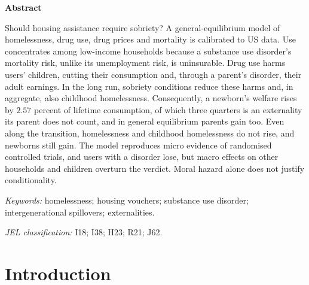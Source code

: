 \documentclass[10pt]{article}
\makeatletter
\newif\ifshowupdates \showupdatesfalse
\newcommand{\listofupdates}{\ifshowupdates\par\noindent{\color{blue}\textbf{Pending updates from the new simulations}}\par
  {\small\@starttoc{upd}}\fi}
\newcommand{\listofwhys}{\ifshowupdates\par\noindent{\color{whygreen}\textbf{Notes on this round's changes}}\par
  {\small\@starttoc{why}}\fi}
\makeatother
\begin{document}
\vspace{0.4em}
\begin{center}
\begin{minipage}{0.86\textwidth}
\begin{center}\textbf{Abstract}\end{center}
\noindent Should housing assistance require sobriety? A general-equilibrium model of homelessness, drug use, drug prices and mortality is calibrated to US data. Use concentrates among low-income households because a substance use disorder's mortality risk, unlike its unemployment risk, is uninsurable. Drug use harms users' children, cutting their consumption and, through a parent's disorder, their adult earnings. In the long run, sobriety conditions reduce these harms and, in aggregate, also childhood homelessness. Consequently, a newborn's welfare rises by $2.57$ percent of lifetime consumption, of which three quarters is an externality its parent does not count, and in general equilibrium parents gain too. Even along the transition, homelessness and childhood homelessness do not rise, and newborns still gain. The model reproduces micro evidence of randomised controlled trials, and users with a disorder lose, but macro effects on other households and children overturn the verdict. Moral hazard alone does not justify conditionality.

\vspace{0.6em}
\noindent\textit{Keywords:} homelessness; housing vouchers; substance
use disorder; intergenerational spillovers; externalities.

\vspace{0.2em}
\noindent\textit{JEL classification:} I18; I38; H23; R21; J62.
\end{minipage}
\end{center}

\vspace{0.8em}


\listofupdates

\listofwhys

\section{Introduction}\label{sec:intro}
\end{document}

